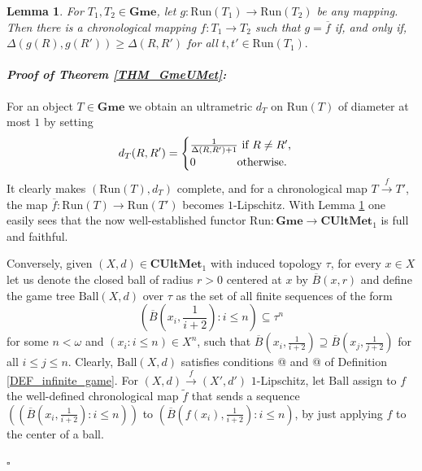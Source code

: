 \documentclass[12pt]{amsart}
\makeatletter
\newcommand*{\rom}[1]{\expandafter\@slowromancap\romannumeral #1@}
\newtheorem{lemma}[thm]{Lemma}
\theoremstyle{definition}
\newenvironment{myproof}[2] {\paragraph{\it Proof of {#1} {\ref{#2}}:}}{\hfill$\square$}
\newcommand{\seq}[1]{{\left( {#1} \right)}}
\newcommand{\Run}{{\mathrm{Run}}}
\newcommand{\CUMet}{\mathbf{CUltMet}_1}
\newcommand{\Gmes}{\mathbf{Gme}}
\makeatother
\begin{document}
\begin{lemma}\label{PROP_ChronDeltaChar}
	For $T_1,T_2\in \Gmes$, let $g\colon \Run(T_1)\to \Run(T_2)$ be any mapping. Then there is a chronological mapping $f\colon T_1\to T_2$ such that $g=\overline{f}$ if, and only if, $\Delta(g(R),g(R'))\ge \Delta(R,R')$ for all $t,t'\in \Run(T_1).$
\end{lemma}

\begin{myproof}{Theorem}{THM_GmeUMet}
	
	For an object $T\in\Gmes$ we obtain an ultrametric $d_T$ on $\Run(T)$ of diameter at most $1$ by setting
	\[
	d_T(R,R')=\begin{cases}
		\frac{1}{\Delta(R,R')+1}\text{ if $R\neq R'$,}\\
		0 \text{\qquad\quad\,\, otherwise.}
	\end{cases}
	\]
	It clearly makes $(\Run(T),d_T)$ complete, and 
	for a chronological map $T\stackrel{f}{\to} T'$, the map $\overline{f}\colon \Run(T)\to \Run(T')$ becomes $1$-Lipschitz.
	With Lemma  \ref{PROP_ChronDeltaChar} one easily sees that the now well-established functor $\Run:\Gmes\to\CUMet$ is full and faithful.
	
	Conversely, given  $(X,d)\in \CUMet$ with induced topology $\tau$, for every $x\in X$ let us denote the closed ball of radius $r>0$ centered at $x$ by $\overline{B}(x, r)$ and define the game tree $\mathrm{Ball}(X,d)$ over $\tau$ as the set of all finite sequences of the form
	\[
	\seq{\overline{B}(x_i,\frac{1}{i+2}):i\le n}\subseteq\tau^n
	\]
	for some $n<\omega$ and $\seq{x_i:i\le n}\in X^n$,
	such that $\overline{B}(x_i,\frac{1}{i+2})\supseteq \overline{B}(x_j,\frac{1}{j+2})$ for all $i\le j\le n$. 
	Clearly,  $\mathrm{Ball}(X,d)$ 
	satisfies conditions \rom{1} and \rom{2} of Definition \ref{DEF_infinite_game}. 
	For $(X,d)\stackrel{f}{\to}(X',d')$ $1$-Lipschitz, let $\mathrm{Ball}$ assign to $f$ the well-defined chronological map $\tilde{f}$ that sends a sequence 
	$\left(\seq{\overline{B}\left(x_i,\frac{1}{i+2}\right):i\le n }\right)$ to $\seq{\overline{B}\left(f(x_i),\frac{1}{i+2}\right):i\le n }$, by just applying $f$ to the center of a ball.
	

\end{myproof}
\end{document}
